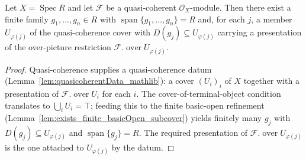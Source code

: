 
\begin{lemma}
  \label{lem:qcoh_finite_presentation_cover}
  Let \(X = \operatorname{Spec} R\) and let \(\mathcal{F}\) be a quasi-coherent
  \(\mathcal{O}_X\)-module. Then there exist a finite family \(g_1, \ldots, g_n \in R\) with
  \(\operatorname{span}\{g_1, \ldots, g_n\} = R\) and, for each \(j\), a member \(U_{\varphi(j)}\) of
  the quasi-coherence cover with \(D(g_j) \subseteq U_{\varphi(j)}\) carrying a presentation of the
  over-picture restriction \(\mathcal{F}.\operatorname{over} U_{\varphi(j)}\).
\end{lemma}
\begin{proof}
  Quasi-coherence supplies a quasi-coherence datum (Lemma~\ref{lem:quasicoherentData_mathlib}): a cover
  \((U_i)_i\) of \(X\) together with a presentation of \(\mathcal{F}.\operatorname{over} U_i\) for each
  \(i\). The cover-of-terminal-object condition translates to \(\bigcup_i U_i = \top\); feeding this to
  the finite basic-open refinement (Lemma~\ref{lem:exists_finite_basicOpen_subcover}) yields finitely
  many \(g_j\) with \(D(g_j) \subseteq U_{\varphi(j)}\) and \(\operatorname{span}\{g_j\} = R\). The
  required presentation of \(\mathcal{F}.\operatorname{over} U_{\varphi(j)}\) is the one attached to
  \(U_{\varphi(j)}\) by the datum.
\end{proof}

